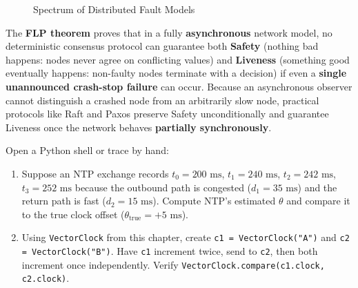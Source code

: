 \begin{figure}[htbp]
\centering
{}
\caption{Spectrum of Distributed Fault Models}
\label{fig:v4-ch01-fault-spectrum}
\end{figure}

\begin{underthehoodbox}
The \textbf{FLP theorem} proves that in a fully \textbf{asynchronous} network model, no deterministic consensus protocol can guarantee both \textbf{Safety} (nothing bad happens: nodes never agree on conflicting values) and \textbf{Liveness} (something good eventually happens: non-faulty nodes terminate with a decision) if even a \textbf{single unannounced crash-stop failure} can occur.
Because an asynchronous observer cannot distinguish a crashed node from an arbitrarily slow node, practical protocols like Raft and Paxos preserve Safety unconditionally and guarantee Liveness once the network behaves \textbf{partially synchronously}.
\end{underthehoodbox}

\begin{tryityourselfbox}
Open a Python shell or trace by hand:
\begin{enumerate}[leftmargin=18pt]
  \item Suppose an NTP exchange records $t_0 = 200\text{ ms}$, $t_1 = 240\text{ ms}$, $t_2 = 242\text{ ms}$, $t_3 = 252\text{ ms}$ because the outbound path is congested ($d_1 = 35\text{ ms}$) and the return path is fast ($d_2 = 15\text{ ms}$). Compute NTP's estimated $\theta$ and compare it to the true clock offset ($\theta_{\text{true}} = +5\text{ ms}$).
  \item Using \texttt{VectorClock} from this chapter, create \texttt{c1 = VectorClock("A")} and \texttt{c2 = VectorClock("B")}. Have \texttt{c1} increment twice, send to \texttt{c2}, then both increment once independently. Verify \texttt{VectorClock.compare(c1.clock, c2.clock)}.
\end{enumerate}
\end{tryityourselfbox}

